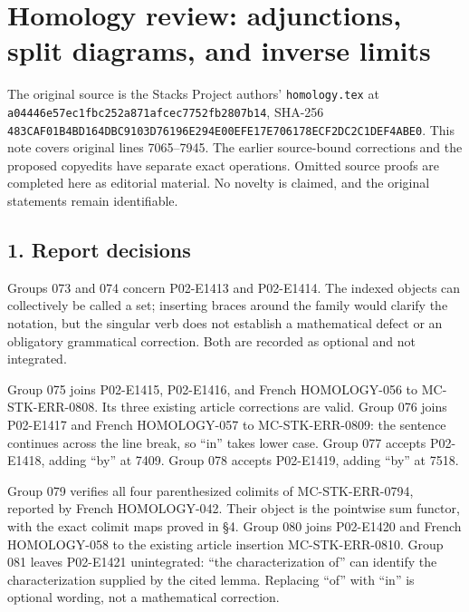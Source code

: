 \documentclass[11pt]{article}
\begin{document}
\section{Homology review: adjunctions, split diagrams, and inverse limits}\label{note-09-homology-review-adjunctions-split-diagrams-and-inverse-limits}

The original source is the Stacks Project authors' \texttt{homology.tex} at \texttt{a04446e5\allowbreak{}7ec1fbc2\allowbreak{}52a871af\allowbreak{}cec7752f\allowbreak{}b2807b14}, SHA-256 \texttt{483CAF01\allowbreak{}B4BD164D\allowbreak{}BC9103D7\allowbreak{}6196E294\allowbreak{}E00EFE17\allowbreak{}E706178E\allowbreak{}CF2DC2C1\allowbreak{}DEF4ABE0}. This note covers original lines 7065--7945. The earlier source-bound corrections and the proposed copyedits have separate exact operations. Omitted source proofs are completed here as editorial material. No novelty is claimed, and the original statements remain identifiable.

\subsection{1. Report decisions}\label{note-09-report-decisions}

Groups 073 and 074 concern P02-E1413 and P02-E1414. The indexed objects can collectively be called a set; inserting braces around the family would clarify the notation, but the singular verb does not establish a mathematical defect or an obligatory grammatical correction. Both are recorded as optional and not integrated.

Group 075 joins P02-E1415, P02-E1416, and French HOMOLOGY-056 to MC-STK-ERR-0808. Its three existing article corrections are valid. Group 076 joins P02-E1417 and French HOMOLOGY-057 to MC-STK-ERR-0809: the sentence continues across the line break, so ``in'' takes lower case. Group 077 accepts P02-E1418, adding ``by'' at 7409. Group 078 accepts P02-E1419, adding ``by'' at 7518.

Group 079 verifies all four parenthesized colimits of MC-STK-ERR-0794, reported by French HOMOLOGY-042. Their object is the pointwise sum functor, with the exact colimit maps proved in §4. Group 080 joins P02-E1420 and French HOMOLOGY-058 to the existing article insertion MC-STK-ERR-0810. Group 081 leaves P02-E1421 unintegrated: ``the characterization of'' can identify the characterization supplied by the cited lemma. Replacing ``of'' with ``in'' is optional wording, not a mathematical correction.
\end{document}
